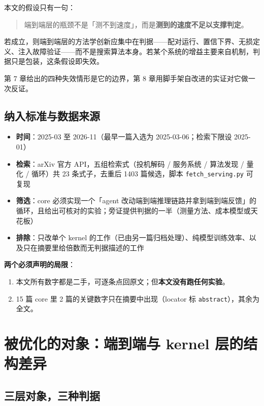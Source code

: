 本文的假设只有一句：


\begin{quote}\small
端到端层的瓶颈不是「测不到速度」，而是\textbf{测到的速度不足以支撑判定}。

\end{quote}

若成立，则端到端层的方法学创新应集中在判据——配对运行、置信下界、无损定义、注入故障验证——而不是搜索算法本身。若某个系统的增益主要来自机制，判据只是包装，这条假设即失效。


第 7 章给出的四种失效情形是它的边界，第 8 章用脚手架自改进的实证对它做一次反证。


\subsection{纳入标准与数据来源}

\begin{itemize}
  \item \textbf{时间}：2025-03 至 2026-11（最早一篇入选为 2025-03-06；检索下限设 2025-01）
  \item \textbf{检索}：arXiv 官方 API，五组检索式（投机解码 / 服务系统 / 算法发现 / 量化 / 循环）共 23 条式子，去重后 1403 篇候选，脚本 \texttt{fetch\_serving.py} 可复现
  \item \textbf{筛选}：core 必须实现一个「agent 改动端到端推理链路并拿到端到端反馈」的循环，且给出可核对的实验；旁证提供判据的一半（测量方法、成本模型或天花板）
  \item \textbf{排除}：只改单个 kernel 的工作（已由另一篇归档处理）、纯模型训练效率、以及只在摘要里给倍数而无判据描述的工作
\end{itemize}

 \textbf{两个必须声明的局限}：


\begin{enumerate}
  \item 本文所有数字都是二手，可逐条点回原文；但\textbf{本文没有跑任何实验}。
  \item 15 篇 core 里 2 篇的关键数字只在摘要中出现（locator 标 \texttt{abstract}），其余为全文。
\end{enumerate}

\section{被优化的对象：端到端与 kernel 层的结构差异}

\subsection{三层对象，三种判据}

